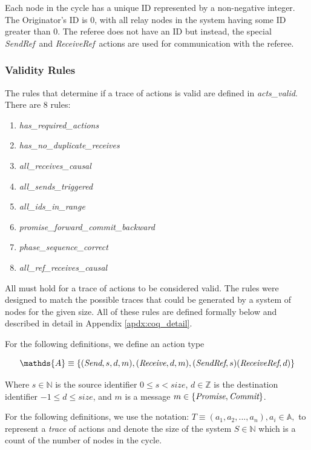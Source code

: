 \documentclass[runningheads]{llncs}
\newcommand{\send}{\emph{Send}}
\newcommand{\receive}{\emph{Receive}}
\newcommand{\sendref}{\emph{SendRef}}
\newcommand{\receiveref}{\emph{ReceiveRef}}
\newcommand{\action}{\mathds{A}}
\newcommand{\promise}{\emph{Promise}}
\newcommand{\commit}{\emph{Commit}}
\newif\ifcomments
\newif\ifkylecomments
\newcommand{\egm}[1]{\ifcomments\textcolor{orange}{egm: #1}\fi}
\newcommand{\krs}[1]{\ifkylecomments\textcolor{blue}{krs: #1}\fi}
\begin{document}
Each node in the cycle has a unique ID represented by a non-negative integer. The Originator's ID is 0, with all relay nodes in the system having some ID greater than 0. The referee does not have an ID but instead, the special \sendref\ and \receiveref\ actions are used for communication with the referee. 

\subsubsection{Validity Rules} \label{sec:validity_rules}
The rules that determine if a trace of actions is valid are defined in \emph{acts\_valid}. There are 8 rules:

\begin{enumerate}
  \itemsep 0pt
  \item \emph{has\_required\_actions}
  \item \emph{has\_no\_duplicate\_receives}
  \item \emph{all\_receives\_causal}
  \item \emph{all\_sends\_triggered}
  \item \emph{all\_ids\_in\_range}
  \item \emph{promise\_forward\_commit\_backward}
  \item \emph{phase\_sequence\_correct}
  \item \emph{all\_ref\_receives\_causal}
\end{enumerate}

All must hold for a trace of actions to be considered valid. The rules were designed to match the possible traces that could be generated by a system of nodes for the given size. All of these rules are defined formally below and described in detail in Appendix \ref{apdx:coq_detail}.

\krs{I've been pretty good at using emph like $\emph{who}$ which is nice because it works in and out of math mode. Should I stay consistent with that? \egm{Here is a big tedious change. Text is math mode must be protected to keep LaTeX from formatting individual characters in a string as individual single letter variables. If not protected, then the string has strange spacing between characters. Protecting is easy: $who$ becomes $\mathit{who}$. That is it. There is also the `bf` and `rm` suffices for bold face and roman respectively. You need to make that change universally.}}
For the following definitions, we define an action type 
\begin{definition}
$$\action \equiv \{(\send, s, d, m), (\receive, d, m), (\sendref, s) (\receiveref, d)\}$$

Where $s \in \mathds{N}$ is the source identifier $0 \le s < size$, $d \in \mathds{Z}$ is the destination identifier $-1 \le d \le size$, and $m$ is a message $m \in \{\promise, \commit\}$.

\end{definition}
For the following definitions, we use the notation: 
$T \equiv (a_1, a_2, ..., a_n), a_i \in \action,$ to represent a \emph{trace} of actions and denote the size of the system $S \in \mathds{N}$ which is a count of the number of nodes in the cycle.
\end{document}
